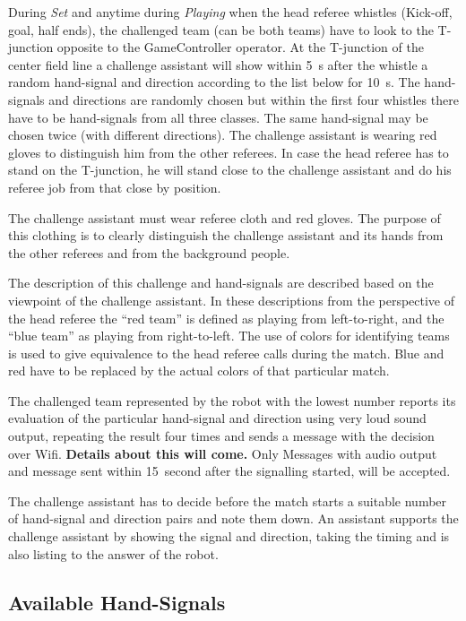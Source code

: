 During \textit{Set} and anytime during \textit{Playing} when the head referee whistles (Kick-off, goal, half ends), the challenged team (can be both teams) have to look to the T-junction opposite to the GameController operator. At the T-junction of the center field line a challenge assistant will show within \qty{5}{\second} after the whistle a random hand-signal and direction according to the list below for \qty{10}{\second}. The hand-signals and directions are randomly chosen but within the first four whistles there have to be hand-signals from all three classes. The same hand-signal may be chosen twice (with different directions). The challenge assistant is wearing red gloves to distinguish him from the other referees. In case the head referee has to stand on the T-junction, he will stand close to the challenge assistant and do his referee job from that close by position.

The challenge assistant must wear referee cloth and red gloves. The purpose of this clothing is to clearly distinguish the challenge assistant and its hands from the other referees and from the background people. 

The description of this challenge and hand-signals are described based on the viewpoint of the challenge assistant. In these descriptions from the perspective of the head referee the ``red team'' is defined as playing from left-to-right, and the ``blue team'' as playing from right-to-left. The use of colors for identifying teams is used to give equivalence to the head referee calls during the match. Blue and red have to be replaced by the actual colors of that particular match.

The challenged team represented by the robot with the lowest number reports its evaluation of the particular hand-signal and direction using very loud sound output, repeating the result four times and sends a message with the decision over Wifi. \textbf{Details about this will come.} Only Messages with audio output and message sent within \qty{15}{second} after the signalling started, will be accepted.

The challenge assistant has to decide before the match starts a suitable number of hand-signal and direction pairs and note them down. An assistant supports the challenge assistant by showing the signal and direction, taking the timing and is also listing to the answer of the robot.

\subsection{Available Hand-Signals}

